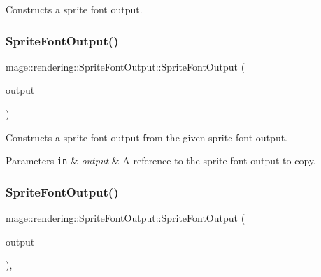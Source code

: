 Constructs a sprite font output. \mbox{\label{structmage_1_1rendering_1_1_sprite_font_output_a304a4627f0aaacdb0f9dd0951421c8a2}} 
\subsubsection{\texorpdfstring{Sprite\+Font\+Output()}{SpriteFontOutput()}\hspace{0.1cm}{\footnotesize\ttfamily [2/3]}}
{\footnotesize\ttfamily mage\+::rendering\+::\+Sprite\+Font\+Output\+::\+Sprite\+Font\+Output (\begin{DoxyParamCaption}\item[{const \mbox{\hyperlink{structmage_1_1rendering_1_1_sprite_font_output}{Sprite\+Font\+Output}} \&}]{output }\end{DoxyParamCaption})\hspace{0.3cm}{\ttfamily [delete]}}

Constructs a sprite font output from the given sprite font output.


\begin{DoxyParams}[1]{Parameters}
\mbox{\tt in}  & {\em output} & A reference to the sprite font output to copy. \\
\hline
\end{DoxyParams}
\mbox{\label{structmage_1_1rendering_1_1_sprite_font_output_a19714991b6c2e2aa842022b5c7e281cb}} 
\subsubsection{\texorpdfstring{Sprite\+Font\+Output()}{SpriteFontOutput()}\hspace{0.1cm}{\footnotesize\ttfamily [3/3]}}
{\footnotesize\ttfamily mage\+::rendering\+::\+Sprite\+Font\+Output\+::\+Sprite\+Font\+Output (\begin{DoxyParamCaption}\item[{\mbox{\hyperlink{structmage_1_1rendering_1_1_sprite_font_output}{Sprite\+Font\+Output}} \&\&}]{output }\end{DoxyParamCaption})\hspace{0.3cm}{\ttfamily [default]}, {\ttfamily [noexcept]}}

